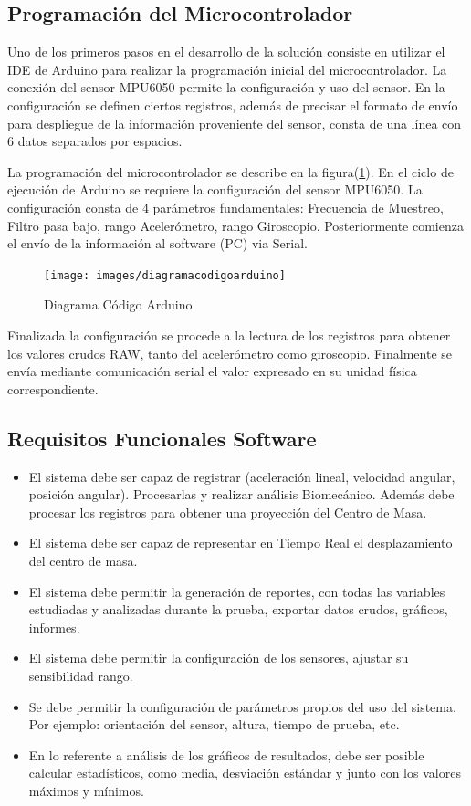 \documentclass[12pt,a4paper]{article}
\begin{document}
\subsection{Programación del Microcontrolador}
Uno de los primeros pasos en el desarrollo de la solución consiste en utilizar el IDE de Arduino para realizar la programación inicial del microcontrolador. La conexión del sensor MPU6050 permite la configuración y uso del sensor.
En la configuración se definen ciertos registros, además de precisar el formato de envío para despliegue de la información proveniente del sensor, consta de una línea con 6 datos separados por espacios.

La programación del microcontrolador se describe en la figura(\ref{fig:arduinocode}).
En el ciclo de ejecución de Arduino se requiere la configuración del sensor MPU6050. La configuración consta de 4 parámetros fundamentales: Frecuencia de Muestreo, Filtro pasa bajo, rango Acelerómetro, rango Giroscopio. Posteriormente comienza el envío de la información al software (PC) via Serial.

\begin{figure}[H]
	\centering
	\texttt{[image: images/diagramacodigoarduino]}
	\caption{Diagrama Código Arduino}
	\label{fig:arduinocode}
\end{figure}

Finalizada la configuración se procede a la lectura de los registros para obtener los valores crudos RAW, tanto del acelerómetro como giroscopio. Finalmente se envía mediante comunicación serial el valor expresado en su unidad física correspondiente.

\subsection{Requisitos Funcionales Software}
\begin{itemize}
	\item El sistema debe ser capaz de registrar (aceleración lineal, velocidad angular, posición angular). Procesarlas y realizar análisis Biomecánico. Además debe procesar los registros para obtener una proyección del Centro de Masa.
	\item El sistema debe ser capaz de representar en Tiempo Real el desplazamiento del centro de masa.
	\item El sistema debe permitir la generación de reportes, con todas las variables estudiadas y analizadas durante la prueba, exportar datos crudos, gráficos, informes.
	\item El sistema debe permitir la configuración de los sensores, ajustar su sensibilidad rango.
	\item Se debe permitir la configuración de parámetros propios del uso del sistema. Por ejemplo: orientación del sensor, altura, tiempo de prueba, etc.
	\item En lo referente a análisis de los gráficos de resultados, debe ser posible calcular estadísticos, como media, desviación estándar y junto con los valores máximos y mínimos.
\end{itemize} 
\end{document}
